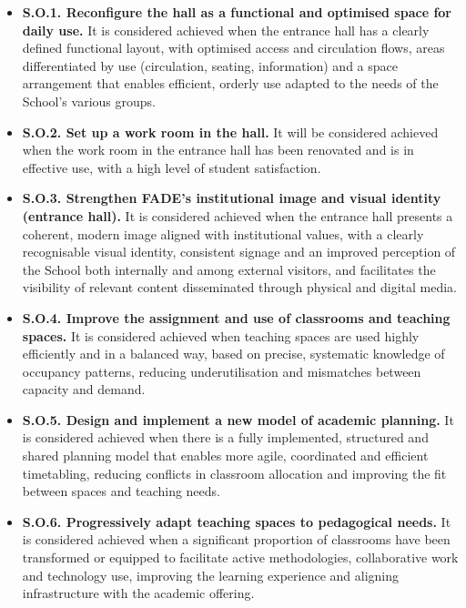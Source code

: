 \documentclass[11pt,a4paper]{scrreprt}
\begin{document}
\begin{itemize}

\item \textbf{S.O.1. Reconfigure the hall as a functional and optimised space for daily use.}  
It is considered achieved when the entrance hall has a clearly defined functional layout, with optimised access and circulation flows, areas differentiated by use (circulation, seating, information) and a space arrangement that enables efficient, orderly use adapted to the needs of the School's various groups.

\item \textbf{S.O.2. Set up a work room in the hall.}
It will be considered achieved when the work room in the entrance hall has been renovated and is in effective use, with a high level of student satisfaction.

\item \textbf{S.O.3. Strengthen FADE's institutional image and visual identity (entrance hall).}  
It is considered achieved when the entrance hall presents a coherent, modern image aligned with institutional values, with a clearly recognisable visual identity, consistent signage and an improved perception of the School both internally and among external visitors, and facilitates the visibility of relevant content disseminated through physical and digital media.

\item \textbf{S.O.4. Improve the assignment and use of classrooms and teaching spaces.}  
It is considered achieved when teaching spaces are used highly efficiently and in a balanced way, based on precise, systematic knowledge of occupancy patterns, reducing underutilisation and mismatches between capacity and demand.

\item \textbf{S.O.5. Design and implement a new model of academic planning.}  
It is considered achieved when there is a fully implemented, structured and shared planning model that enables more agile, coordinated and efficient timetabling, reducing conflicts in classroom allocation and improving the fit between spaces and teaching needs.

\item \textbf{S.O.6. Progressively adapt teaching spaces to pedagogical needs.}  
It is considered achieved when a significant proportion of classrooms have been transformed or equipped to facilitate active methodologies, collaborative work and technology use, improving the learning experience and aligning infrastructure with the academic offering.


\end{itemize}
\end{document}
